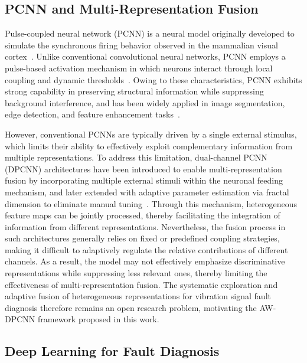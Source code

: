 \documentclass[pdflatex,sn-mathphys-num]{sn-jnl}
\theoremstyle{thmstyleone}%
\theoremstyle{thmstyletwo}%
\theoremstyle{thmstylethree}%
\begin{document}
\subsection{PCNN and Multi-Representation Fusion}

Pulse-coupled neural network (PCNN) is a neural model originally developed to simulate the synchronous firing behavior observed in the mammalian visual cortex~\cite{761706}. Unlike conventional convolutional neural networks, PCNN employs a pulse-based activation mechanism in which neurons interact through local coupling and dynamic thresholds~\cite{761716}. Owing to these characteristics, PCNN exhibits strong capability in preserving structural information while suppressing background interference, and has been widely applied in image segmentation, edge detection, and feature enhancement tasks~\cite{1427771,Deng_2020,Liu_2019}.

However, conventional PCNNs are typically driven by a single external stimulus, which limits their ability to effectively exploit complementary information from multiple representations. To address this limitation, dual-channel PCNN (DPCNN) architectures have been introduced to enable multi-representation fusion by incorporating multiple external stimuli within the neuronal feeding mechanism, and later extended with adaptive parameter estimation via fractal dimension to eliminate manual tuning~\cite{9072551}. Through this mechanism, heterogeneous feature maps can be jointly processed, thereby facilitating the integration of information from different representations. Nevertheless, the fusion process in such architectures generally relies on fixed or predefined coupling strategies, making it difficult to adaptively regulate the relative contributions of different channels. As a result, the model may not effectively emphasize discriminative representations while suppressing less relevant ones, thereby limiting the effectiveness of multi-representation fusion. The systematic exploration and adaptive fusion of heterogeneous representations for vibration signal fault diagnosis therefore remains an open research problem, motivating the AW-DPCNN framework proposed in this work.

\subsection{Deep Learning for Fault Diagnosis}
\end{document}
